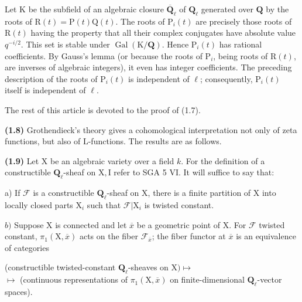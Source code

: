 \documentclass[10pt,leqno]{article}
\begin{document}
\noindent Let \(\mathrm{K}\) be the subfield of an algebraic closure \(\overline{\mathbf{Q}}_{\ell }\) of \(\mathbf{Q}_{\ell }\) generated over \(\mathbf{Q}\) by the roots of \(\mathrm{R}(t)=\mathrm{P}(t)\mathrm{Q}(t)\). The roots of \(\mathrm{P}_{i}(t)\) are precisely those roots of \(\mathrm{R}(t)\) having the property that all their complex conjugates have absolute value \(q^{- i/2}\). This set is stable under \(\operatorname{Gal}(\mathrm{K}/\mathbf{Q})\). Hence \(\mathrm{P}_{i}(t)\) has rational coefficients. By Gauss’s lemma (or because the roots of \(\mathrm{P}_{i}\), being roots of \(\mathrm{R}(t)\), are inverses of algebraic integers), it even has integer coefficients. The preceding description of the roots of \(\mathrm{P}_{i}(t)\) is independent of \(\ell \); consequently, \(\mathrm{P}_{i}(t)\) itself is independent of \(\ell \).\par

\noindent The rest of this article is devoted to the proof of (1.7).\par

\noindent \textbf{(1.8)} Grothendieck’s theory gives a cohomological interpretation not only of zeta functions, but also of \(\mathrm{L}\)-functions. The results are as follows.\par

\noindent \textbf{(1.9)} Let \(\mathrm{X}\) be an algebraic variety over a field \(k\). For the definition of a constructible \(\mathbf{Q}_{\ell }\)-sheaf on \(\mathrm{X}, \mathrm{I}\) refer to SGA 5 VI. It will suffice to say that:\par

\noindent a) If \(\mathcal{F} \) is a constructible \(\mathbf{Q}_{\ell }\)-sheaf on \(\mathrm{X}\), there is a finite partition of \(\mathrm{X}\) into locally closed parts \(\mathrm{X}_{i}\) such that \(\mathcal{F} |\mathrm{X}_{i}\) is twisted constant.\par

\noindent \(b)\) Suppose \(\mathrm{X}\) is connected and let \(\overline{x}\) be a geometric point of \(\mathrm{X}\). For \(\mathcal{F} \) twisted constant, \(\pi _{1}(\mathrm{X},\overline{x})\) acts on the fiber \(\mathcal{F} _{\overline{x}}\); the fiber functor at \(\overline{x}\) is an equivalence of categories\par

\begin{center}(constructible twisted-constant \(\mathbf{Q}_{\ell }\)-sheaves on \(\mathrm{X}) \longmapsto \)\\ \(\longmapsto \) (continuous representations of \(\pi _{1}(\mathrm{X},\overline{x})\) on finite-dimensional \(\mathbf{Q}_{\ell }\)-vector spaces).\end{center}
\end{document}
